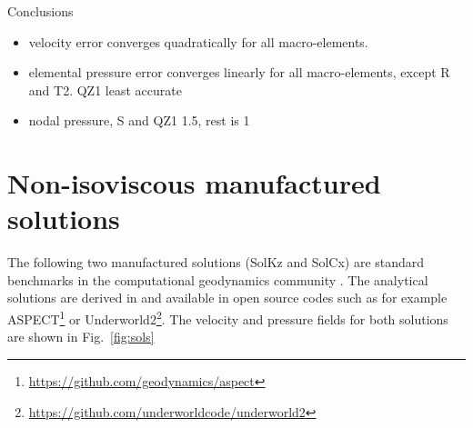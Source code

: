 \documentclass[a4paper,12pt]{article}
\begin{document}
Conclusions
\begin{itemize}
\item velocity error converges quadratically for all macro-elements.
\item elemental pressure error converges linearly for all macro-elements, except R and T2.
QZ1 least accurate
\item nodal pressure, S and QZ1 1.5, rest is 1 
\end{itemize}





\section{Non-isoviscous manufactured solutions}



The following two manufactured solutions (SolKz and SolCx) are 
standard benchmarks in the computational geodynamics 
community  \cite{mozg96,mamo08,krhb12,gemd13,demh19,thba22}.
The analytical solutions are derived in \cite{zhon96} and available in open source codes
such as for example ASPECT\footnote{\url{https://github.com/geodynamics/aspect}} or 
Underworld2\footnote{\url{https://github.com/underworldcode/underworld2}}.
The velocity and pressure fields for both solutions are shown in Fig.~\ref{fig:sols}
\end{document}
